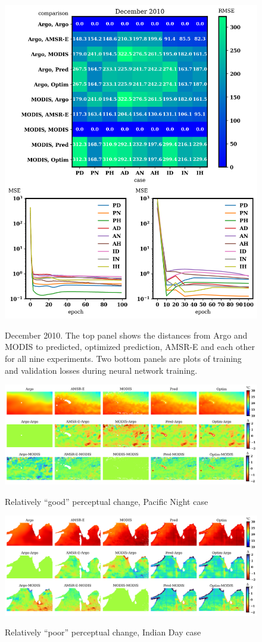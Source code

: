 \begin{figure}[!ht]
	\centering
    \caption{December 2010. The top panel shows the distances from Argo and MODIS to predicted, optimized prediction, AMSR-E and each other for all nine experiments. Two bottom panels are plots of training and validation losses during neural network training.}
	\includegraphics[width=1.0\linewidth]{m2/ims/fig2_8.png}
    \label{fig2_8}
\end{figure}

\begin{figure}[!ht]
	\centering
    \caption{Relatively “good” perceptual change, Pacific Night case}
	\includegraphics[width=1.0\linewidth]{m2/ims/fig2_9.png}
    \label{fig2_9}
\end{figure}


\begin{figure}[!ht]
	\centering
    \caption{Relatively “poor” perceptual change, Indian Day case}
	\includegraphics[width=1.0\linewidth]{m2/ims/fig2_10.png}
    \label{fig2_10}
\end{figure}

